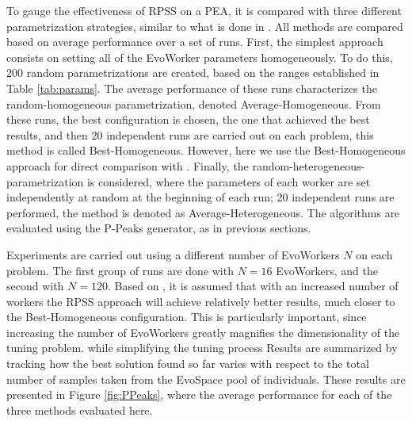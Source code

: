 To gauge the effectiveness of RPSS on a PEA, it is compared with three different parametrization strategies, similar to what is done in \cite{fuku1,fuku2}.
All methods are compared based on average performance over a set of runs.
First, the simplest approach consists on setting all of the EvoWorker parameters homogeneously.
To do this, 200 random parametrizations are created, based on the ranges established in Table \ref{tab:params}.
The average performance of these runs characterizes the random-homogeneous parametrization, denoted Average-Homogeneous.
From these runs, the best configuration is chosen, the one that achieved the best results,
and then 20 independent runs are carried out on each problem, this method is called Best-Homogeneous.
However, here we use the Best-Homogeneous approach for direct comparison with \cite{fuku1,fuku2}.
Finally, the random-heterogeneous-parametrization is considered, where the parameters of each worker are set independently at random at
the beginning of each run; 20 independent runs are performed, the method is denoted as Average-Heterogeneous.
The algorithms are evaluated using the P-Peaks generator, as in previous sections.

Experiments are carried out using a different number of EvoWorkers $N$ on each problem.
The first group of runs are done with $N=16$ EvoWorkers, and the second with $N=120$.
Based on \cite{fuku1,fuku2}, it is assumed that with an increased number of workers the RPSS approach will achieve relatively better results, much closer to
the Best-Homogeneous configuration.
This is particularly important, since increasing the number of EvoWorkers greatly magnifies the dimensionality of the tuning problem.
while simplifying the tuning process
Results are summarized by tracking how the best solution found so far varies with respect to the total
number of samples taken from the EvoSpace pool of individuals.
These results are presented in Figure \ref{fig:PPeaks}, where the average performance for
each of the three methods evaluated here.

